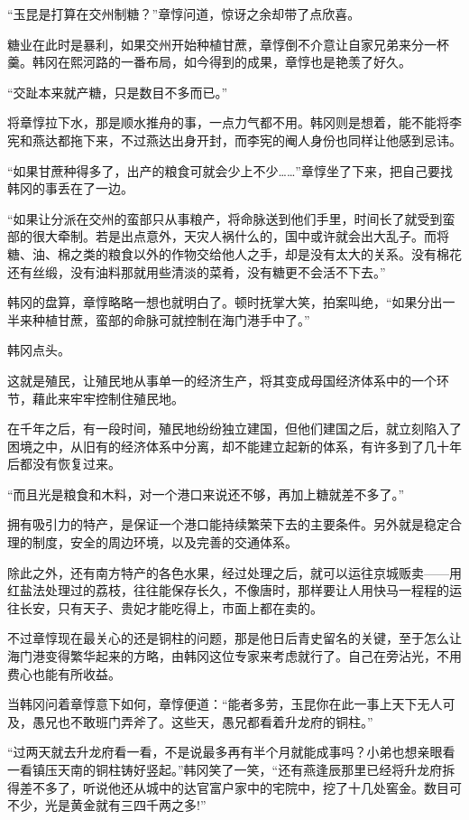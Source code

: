 “玉昆是打算在交州制糖？”章惇问道，惊讶之余却带了点欣喜。

糖业在此时是暴利，如果交州开始种植甘蔗，章惇倒不介意让自家兄弟来分一杯羹。韩冈在熙河路的一番布局，如今得到的成果，章惇也是艳羡了好久。

“交趾本来就产糖，只是数目不多而已。”

将章惇拉下水，那是顺水推舟的事，一点力气都不用。韩冈则是想着，能不能将李宪和燕达都拖下来，不过燕达出身开封，而李宪的阉人身份也同样让他感到忌讳。

“如果甘蔗种得多了，出产的粮食可就会少上不少……”章惇坐了下来，把自己要找韩冈的事丢在了一边。

“如果让分派在交州的蛮部只从事粮产，将命脉送到他们手里，时间长了就受到蛮部的很大牵制。若是出点意外，天灾人祸什么的，国中或许就会出大乱子。而将糖、油、棉之类的粮食以外的作物交给他人之手，却是没有太大的关系。没有棉花还有丝缎，没有油料那就用些清淡的菜肴，没有糖更不会活不下去。”

韩冈的盘算，章惇略略一想也就明白了。顿时抚掌大笑，拍案叫绝，“如果分出一半来种植甘蔗，蛮部的命脉可就控制在海门港手中了。”

韩冈点头。

这就是殖民，让殖民地从事单一的经济生产，将其变成母国经济体系中的一个环节，藉此来牢牢控制住殖民地。

在千年之后，有一段时间，殖民地纷纷独立建国，但他们建国之后，就立刻陷入了困境之中，从旧有的经济体系中分离，却不能建立起新的体系，有许多到了几十年后都没有恢复过来。

“而且光是粮食和木料，对一个港口来说还不够，再加上糖就差不多了。”

拥有吸引力的特产，是保证一个港口能持续繁荣下去的主要条件。另外就是稳定合理的制度，安全的周边环境，以及完善的交通体系。

除此之外，还有南方特产的各色水果，经过处理之后，就可以运往京城贩卖——用红盐法处理过的荔枝，往往能保存长久，不像唐时，那样要让人用快马一程程的运往长安，只有天子、贵妃才能吃得上，市面上都在卖的。

不过章惇现在最关心的还是铜柱的问题，那是他日后青史留名的关键，至于怎么让海门港变得繁华起来的方略，由韩冈这位专家来考虑就行了。自己在旁沾光，不用费心也能有所收益。

当韩冈问着章惇意下如何，章惇便道：“能者多劳，玉昆你在此一事上天下无人可及，愚兄也不敢班门弄斧了。这些天，愚兄都看着升龙府的铜柱。”

“过两天就去升龙府看一看，不是说最多再有半个月就能成事吗？小弟也想亲眼看一看镇压天南的铜柱铸好竖起。”韩冈笑了一笑，“还有燕逢辰那里已经将升龙府拆得差不多了，听说他还从城中的达官富户家中的宅院中，挖了十几处窖金。数目可不少，光是黄金就有三四千两之多!”


